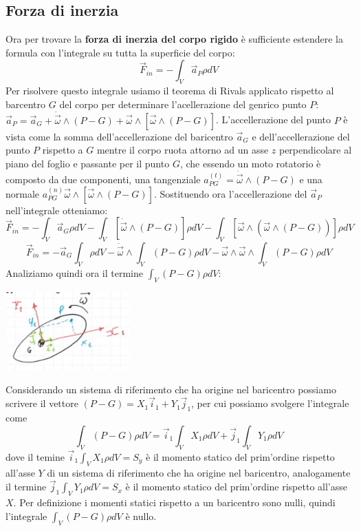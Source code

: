 \subsection*{Forza di inerzia}
Ora per trovare la \textbf{forza di inerzia del corpo rigido} è sufficiente estendere la formula con l'integrale su tutta la superficie del corpo:
\[
    \vec{F}_{in} = - \int_V \vec{a}_P \rho dV
\]
Per risolvere questo integrale usiamo il teorema di Rivals applicato rispetto al barcentro $G$ del corpo per determinare l'acellerazione del genrico punto $P$: $\vec{a}_P = \vec{a}_G + \dot{\vec{\omega}}\land(P-G) + \vec{\omega}\land [\vec{\omega}\land (P-G)]$.\newline
L'accellerazione del punto $P$ è vista come la somma dell'accellerazione del baricentro  $\vec{a}_G$  e  dell'accellerazione del punto $P$ rispetto a $G$ mentre il corpo ruota attorno ad un asse $z$ perpendicolare al piano del foglio e passante per il punto $G$, che essendo un moto rotatorio è composto da due componenti, una tangenziale $a_{PG}^{(t)} = \dot{\vec{\omega}}\land(P-G)$ e una normale $a_{PG}^{(n)}\vec{\omega}\land [\vec{\omega}\land (P-G)]$.\newline
Sostituendo ora l'accellerazione del $\vec{a}_P$ nell'integrale otteniamo:
\[
    \vec{F}_{in} = - \int_V \vec{a}_G \rho dV - \int_V \left[ \dot{\vec{\omega}} \land (P-G) \right] \rho dV - \int_V \left[ \vec{\omega} \land (\vec{\omega} \land (P-G)) \right] \rho dV
\]
\[
    \vec{F}_{in} = - \vec{a}_G \int_V \rho d V - \dot{\vec{\omega}} \land \int_V (P-G) \rho dV - \vec{\omega} \land \vec{\omega} \land \int_V (P-G) \rho dV
\]
Analiziamo quindi ora il termine $\int_V (P-G) \rho dV$:
\begin{center}
    \includegraphics[height=3cm]{../lezione9/img2.JPG}
\end{center}
Considerando un sistema di riferimento che ha origine nel baricentro possiamo scrivere il vettore $(P-G) = X_1 \vec{i}_1 + Y_1 \vec{j}_1$, per cui possiamo svolgere l'integrale come
\[
    \int_V (P-G) \rho dV = \vec{i}_1 \int_V X_1 \rho dV + \vec{j}_1 \int_V Y_1 \rho dV
\]
dove il temine $\vec{i}_1 \int_V X_1 \rho dV = S_y$ è il momento statico del prim'ordine rispetto all'asse $Y$ di un sistema di riferimento che ha origine nel baricentro, analogamente il termine $\vec{j}_1 \int_V Y_1 \rho dV = S_x$ è il momento statico del prim'ordine rispetto all'asse $X$. Per definizione i momenti statici rispetto a un baricentro sono nulli, quindi l'integrale $\int_V (P-G) \rho dV$ è nullo.\newline
